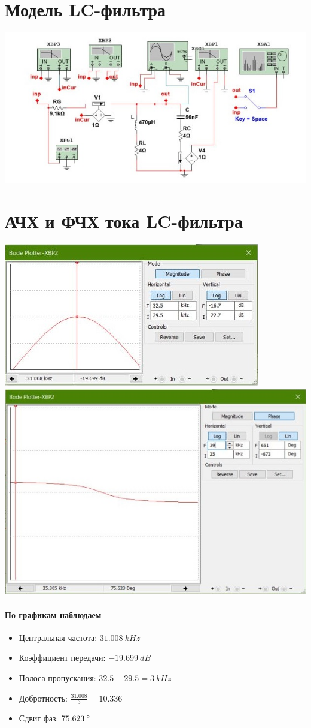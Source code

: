 \documentclass[12pt,a4paper]{article}
\begin{document}
	\section*{Модель LC-фильтра}
	
	\includegraphics[width=\linewidth]{src/model_1}
	
	\section*{АЧХ и ФЧХ тока LC-фильтра}
	
	\includegraphics[width=0.4\linewidth]{src/MFH_1}
	\includegraphics[width=0.4\linewidth]{src/FFH_1_1}
	
	\paragraph*{По графикам наблюдаем}
	\begin{itemize}
		\item Центральная частота: $31.008 \: kHz$ 
		\item Коэффициент передачи: $-19.699 \: dB$
		\item Полоса пропускания: $32.5 - 29.5 = 3 \: kHz$
		\item Добротность: $\frac{31.008}{3} = 10.336$
		\item Сдвиг фаз: $75.623 \: \degree$
	\end{itemize}
	
\end{document}
